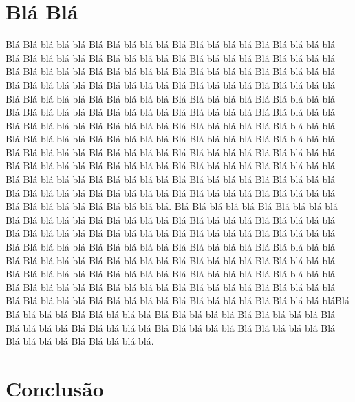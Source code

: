 \documentclass[times, 10pt,twocolumn]{article}
\begin{document}
\section{Blá Blá}
Blá Blá blá blá blá Blá Blá blá blá blá Blá Blá blá blá blá Blá Blá blá blá blá Blá Blá blá blá blá Blá Blá blá blá blá Blá Blá blá blá blá Blá Blá blá blá blá Blá Blá blá blá blá Blá Blá blá blá blá
Blá Blá blá blá blá Blá Blá blá blá blá Blá Blá blá blá blá Blá Blá blá blá blá Blá Blá blá blá blá Blá Blá blá blá blá Blá Blá blá blá blá Blá Blá blá blá blá Blá Blá blá blá blá Blá Blá blá blá blá
Blá Blá blá blá blá Blá Blá blá blá blá Blá Blá blá blá blá Blá Blá blá blá blá Blá Blá blá blá blá Blá Blá blá blá blá Blá Blá blá blá blá Blá Blá blá blá blá Blá Blá blá blá blá Blá Blá blá blá blá
Blá Blá blá blá blá Blá Blá blá blá blá Blá Blá blá blá blá Blá Blá blá blá blá Blá Blá blá blá blá Blá Blá blá blá blá Blá Blá blá blá blá Blá Blá blá blá blá Blá Blá blá blá blá Blá Blá blá blá blá
Blá Blá blá blá blá Blá Blá blá blá blá Blá Blá blá blá blá Blá Blá blá blá blá Blá Blá blá blá blá Blá Blá blá blá blá Blá Blá blá blá blá Blá Blá blá blá blá Blá Blá blá blá blá Blá Blá blá blá blá. 
Blá Blá blá blá blá Blá Blá blá blá blá Blá Blá blá blá blá Blá Blá blá blá blá Blá Blá blá blá blá Blá Blá blá blá blá Blá Blá blá blá blá Blá Blá blá blá blá Blá Blá blá blá blá Blá Blá blá blá blá
Blá Blá blá blá blá Blá Blá blá blá blá Blá Blá blá blá blá Blá Blá blá blá blá Blá Blá blá blá blá Blá Blá blá blá blá Blá Blá blá blá blá Blá Blá blá blá blá Blá Blá blá blá blá Blá Blá blá blá blá
Blá Blá blá blá blá Blá Blá blá blá blá Blá Blá blá blá blá Blá Blá blá blá blá Blá Blá blá blá blá Blá Blá blá blá blá Blá Blá blá blá blá Blá Blá blá blá blá Blá Blá blá blá blá Blá Blá blá blá bláBlá Blá blá blá blá Blá Blá blá blá blá Blá Blá blá blá blá Blá Blá blá blá blá Blá Blá blá blá blá Blá Blá blá blá blá Blá Blá blá blá blá Blá Blá blá blá blá Blá Blá blá blá blá Blá Blá blá blá blá.

\section{Conclusão}
\end{document}

